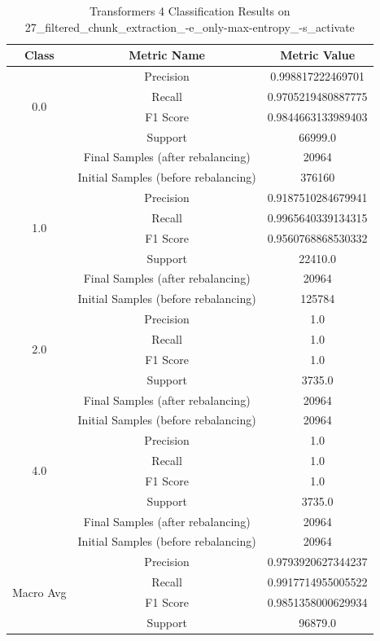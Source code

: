\begin{longtable}{|c|c|c|}
\caption{Transformers 4 Classification Results on 27\_filtered\_chunk\_extraction\_-e\_only-max-entropy\_-s\_activate} \label{tab:27_filtered_chunk_extraction_-e_only-max-entropy_-s_activate_transformers_4_classifiers_results} \\
\hline
Class & Metric Name & Metric Value \\
\hline
\multirow{4}{*}{0.0} & Precision & 0.998817222469701 \\
 & Recall & 0.9705219480887775 \\
 & F1 Score & 0.9844663133989403 \\
 & Support & 66999.0 \\
 & Final Samples (after rebalancing) & 20964 \\
 & Initial Samples (before rebalancing) & 376160 \\
\hline
\multirow{4}{*}{1.0} & Precision & 0.9187510284679941 \\
 & Recall & 0.9965640339134315 \\
 & F1 Score & 0.9560768868530332 \\
 & Support & 22410.0 \\
 & Final Samples (after rebalancing) & 20964 \\
 & Initial Samples (before rebalancing) & 125784 \\
\hline
\multirow{4}{*}{2.0} & Precision & 1.0 \\
 & Recall & 1.0 \\
 & F1 Score & 1.0 \\
 & Support & 3735.0 \\
 & Final Samples (after rebalancing) & 20964 \\
 & Initial Samples (before rebalancing) & 20964 \\
\hline
\multirow{4}{*}{4.0} & Precision & 1.0 \\
 & Recall & 1.0 \\
 & F1 Score & 1.0 \\
 & Support & 3735.0 \\
 & Final Samples (after rebalancing) & 20964 \\
 & Initial Samples (before rebalancing) & 20964 \\
\hline
\multirow{4}{*}{Macro Avg} & Precision & 0.9793920627344237 \\
 & Recall & 0.9917714955005522 \\
 & F1 Score & 0.9851358000629934 \\
 & Support & 96879.0 \\

\end{longtable}
